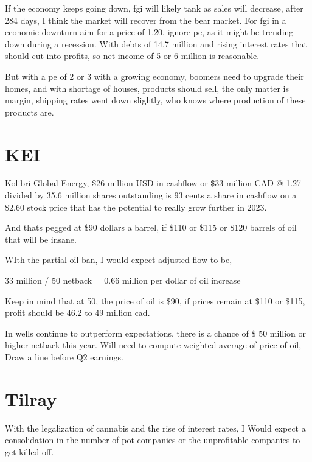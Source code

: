 If the economy keeps going down, fgi will likely tank as sales will decrease, after 284 days, I think the market will recover from the bear market. For fgi in a economic downturn aim for a price of 1.20, ignore pe, as it might be trending down during a recession. With debts of 14.7 million and rising interest rates that should cut into profits, so net income of 5 or 6 million is reasonable.

But with a pe of 2 or 3 with a growing economy, boomers need to upgrade their homes, and with shortage of houses, products should sell, the only matter is margin, shipping rates went down slightly, who knows where production of these products are.

\section{KEI}

Kolibri Global Energy, \$26 million USD in cashflow or \$33 million CAD @ 1.27 divided by 35.6 million shares outstanding is 93 cents a share in cashflow on a \$2.60 stock price that has the potential to really grow further in 2023. 

And thats pegged at \$90 dollars a barrel, if \$110 or \$115 or \$120 barrels of oil that will be insane.


WIth the partial oil ban, I would expect adjusted flow to be, 


33 million / 50 netback = 0.66 million per dollar of oil increase

Keep in mind that at 50, the price of oil is \$90, if prices remain at \$110 or \$115, profit should be 46.2 to 49 million cad.

In wells continue to outperform expectations, there is a chance of \$ 50 million or higher netback this year. Will need to compute weighted average of price of oil, Draw a line before Q2 earnings.


\section{Tilray}

With the legalization of cannabis and the rise of interest rates, I Would expect a consolidation in the number of pot companies or the unprofitable companies to get killed off.


